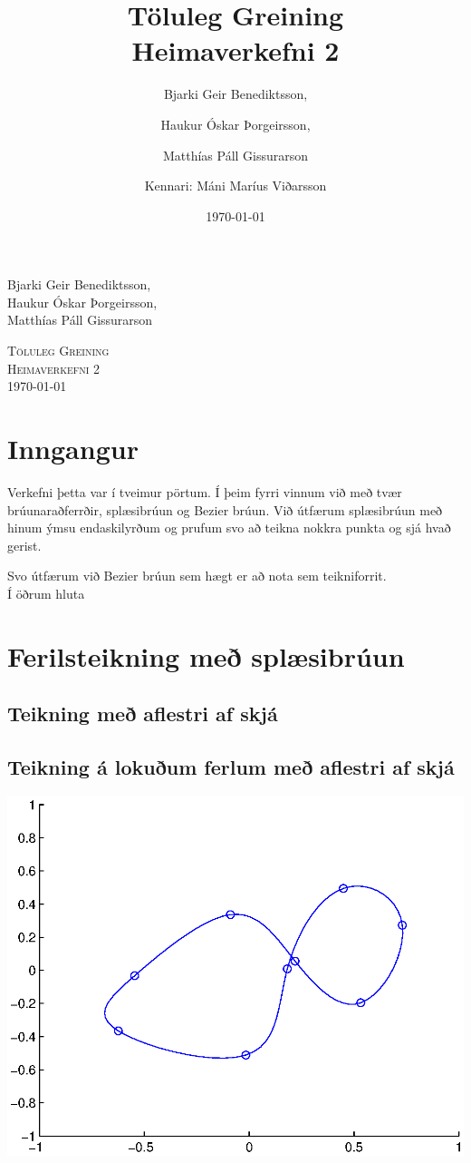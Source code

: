 \documentclass[a4]{article}
\title{Töluleg Greining\\ Heimaverkefni 2}
\date{\today{}}
\author{ 
  Bjarki Geir Benediktsson,\and
  Haukur Óskar Þorgeirsson,\and
  Matthías Páll Gissurarson \and
  Kennari: Máni Maríus Viðarsson
  }
\begin{document}
\begin{flushright}
  Bjarki Geir Benediktsson,\\
  Haukur Óskar Þorgeirsson,\\
  Matthías Páll Gissurarson\\
\end{flushright}

\begin{center}
 \textsc{ \LARGE Töluleg Greining\\
  Heimaverkefni 2\\
  \today{}
  }
  \end{center}
\vfill

\maketitle
\section*{Inngangur}
Verkefni þetta var í tveimur pörtum. Í þeim fyrri vinnum við með tvær brúunaraðferrðir, splæsibrúun og Bezier brúun. Við útfærum splæsibrúun með hinum ýmsu endaskilyrðum og prufum svo að teikna nokkra punkta og sjá hvað gerist.

Svo útfærum við Bezier brúun sem hægt er að nota sem teikniforrit.\\

Í öðrum hluta 
\section{Ferilsteikning með splæsibrúun}
\subsection{Teikning með aflestri af skjá}

\subsection{Teikning á lokuðum ferlum með aflestri af skjá}
\includegraphics[height=0.495\textheight]{Ss1.eps}\\
\end{document}
